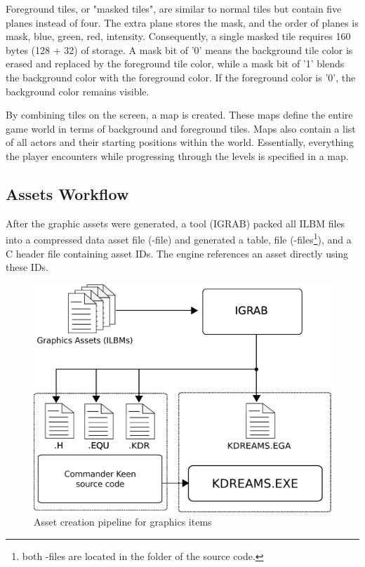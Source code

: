\documentclass[book.tex]{subfiles}
\begin{document}
\par
Foreground tiles, or "masked tiles", are similar to normal tiles but contain five planes instead of four. The extra plane stores the mask, and the order of planes is mask, blue, green, red, intensity. Consequently, a single masked tile requires 160 bytes (128 + 32) of storage. A mask bit of '0' means the background tile color is erased and replaced by the foreground tile color, while a mask bit of '1' blends the background color with the foreground color. If the foreground color is '0', the background color remains visible. \\

\par
By combining tiles on the screen, a map is created. These maps define the entire game world in terms of background and foreground tiles. Maps also contain a list of all actors and their starting positions within the world. Essentially, everything the player encounters while progressing through the levels is specified in a map.

\subsection{Assets Workflow}
After the graphic assets were generated, a tool (IGRAB) packed all ILBM files into a compressed data asset file (-file) and generated a  table,  file (-files\footnote{both -files are located in the  folder of the source code.}), and a C header file containing asset IDs. The engine references an asset directly using these IDs.\\


\begin{figure}[H]
\centering
 \includegraphics[width=.9\textwidth]{imgs/drawings/drawing_plain.eps}
 \caption{Asset creation pipeline for graphics items}
 \label{asset-creation-pipeline}
\end{figure}
\end{document}
